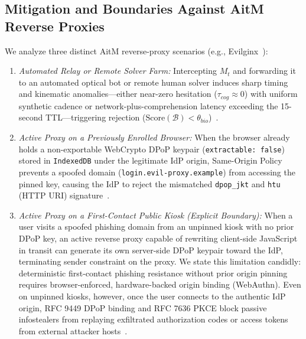 \subsection{Mitigation and Boundaries Against AitM Reverse Proxies}
We analyze three distinct AitM reverse-proxy scenarios (e.g., Evilginx~\cite{kondracki2021catching, lim2025phishers}):
\begin{enumerate}
    \item \textit{Automated Relay or Remote Solver Farm:} Intercepting $M_t$ and forwarding it to an automated optical bot or remote human solver induces sharp timing and kinematic anomalies—either near-zero hesitation ($\tau_{cog} \approx 0$) with uniform synthetic cadence or network-plus-comprehension latency exceeding the 15-second TTL—triggering rejection ($\text{Score}(\mathcal{B}) < \theta_{bio}$)~\cite{khan2024mouse}.
    \item \textit{Active Proxy on a Previously Enrolled Browser:} When the browser already holds a non-exportable WebCrypto DPoP keypair (\texttt{extractable: false}) stored in \texttt{IndexedDB} under the legitimate IdP origin, Same-Origin Policy prevents a spoofed domain (\texttt{login.evil-proxy.example}) from accessing the pinned key, causing the IdP to reject the mismatched \texttt{dpop\_jkt} and \texttt{htu} (HTTP URI) signature~\cite{rfc9449dpop}.
    \item \textit{Active Proxy on a First-Contact Public Kiosk (Explicit Boundary):} When a user visits a spoofed phishing domain from an unpinned kiosk with no prior DPoP key, an active reverse proxy capable of rewriting client-side JavaScript in transit can generate its own server-side DPoP keypair toward the IdP, terminating sender constraint on the proxy. We state this limitation candidly: deterministic first-contact phishing resistance without prior origin pinning requires browser-enforced, hardware-backed origin binding (WebAuthn). Even on unpinned kiosks, however, once the user connects to the authentic IdP origin, RFC 9449 DPoP binding and RFC 7636 PKCE block passive infostealers from replaying exfiltrated authorization codes or access tokens from external attacker hosts~\cite{rfc7636pkce, rfc9449dpop, rfc9700bcp}.
\end{enumerate}
